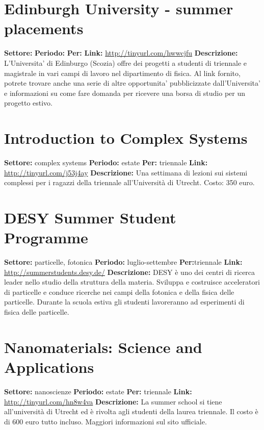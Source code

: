 \documentclass[a4paper,10pt]{article}
\begin{document}
\section{Edinburgh University - summer placements}
\textbf{Settore:} \newline
\textbf{Periodo:} \newline
\textbf{Per:}\newline
\textbf{Link:} \url{http://tinyurl.com/hwwcjfu} \newline
\textbf{Descrizione:}  L'Universita' di Edinburgo (Scozia) offre dei progetti a studenti di triennale e magistrale in vari campi di lavoro nel dipartimento di fisica. Al link fornito, potrete trovare anche una serie di altre opportunita' pubblicizzate dall'Universita' e informazioni su come fare domanda per ricevere una borsa di studio per un progetto estivo. 	

\section{Introduction to Complex Systems}
\textbf{Settore:} complex systems\newline
\textbf{Periodo:} estate\newline
\textbf{Per:} triennale\newline
\textbf{Link:} \url{http://tinyurl.com/j53j4ay} \newline
\textbf{Descrizione:} Una settimana di lezioni sui sistemi complessi per i ragazzi della triennale all'Università di Utrecht. Costo: 350 euro.	

\section{DESY Summer Student Programme}
\textbf{Settore:} particelle, fotonica\newline
\textbf{Periodo:} luglio-settembre \newline
\textbf{Per:}triennale\newline
\textbf{Link:} \url{http://summerstudents.desy.de/} \newline
\textbf{Descrizione:}  DESY è uno dei centri di ricerca leader nello studio della struttura della materia. Sviluppa e costruisce acceleratori di particelle e conduce ricerche nei campi della fotonica e della fisica delle particelle. Durante la scuola estiva gli studenti lavoreranno ad esperimenti di fisica delle particelle.

\section{Nanomaterials: Science and Applications}
\textbf{Settore:} nanoscienze \newline
\textbf{Periodo:} estate \newline
\textbf{Per:} triennale\newline
\textbf{Link:} \url{http://tinyurl.com/hn8w4va} \newline
\textbf{Descrizione:} La summer school si tiene all'università di Utrecht ed è rivolta agli studenti della laurea triennale. Il costo è di 600 euro tutto incluso. Maggiori informazioni sul sito ufficiale.	
\end{document}
